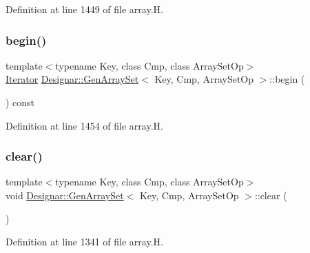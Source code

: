 Definition at line 1449 of file array.\+H.

\mbox{\label{class_designar_1_1_gen_array_set_a9bccd51f6d73a05400361cf5deff8aac}} 
\subsubsection{\texorpdfstring{begin()}{begin()}\hspace{0.1cm}{\footnotesize\ttfamily [2/2]}}
{\footnotesize\ttfamily template$<$typename Key, class Cmp, class Array\+Set\+Op$>$ \\
\hyperlink{class_designar_1_1_gen_array_set_1_1_iterator}{Iterator} \hyperlink{class_designar_1_1_gen_array_set}{Designar\+::\+Gen\+Array\+Set}$<$ Key, Cmp, Array\+Set\+Op $>$\+::begin (\begin{DoxyParamCaption}{ }\end{DoxyParamCaption}) const\hspace{0.3cm}{\ttfamily [inline]}}



Definition at line 1454 of file array.\+H.

\mbox{\label{class_designar_1_1_gen_array_set_aa1b1d249debb38432e56b2e585d822af}} 
\subsubsection{\texorpdfstring{clear()}{clear()}}
{\footnotesize\ttfamily template$<$typename Key, class Cmp, class Array\+Set\+Op$>$ \\
void \hyperlink{class_designar_1_1_gen_array_set}{Designar\+::\+Gen\+Array\+Set}$<$ Key, Cmp, Array\+Set\+Op $>$\+::clear (\begin{DoxyParamCaption}{ }\end{DoxyParamCaption})\hspace{0.3cm}{\ttfamily [inline]}}



Definition at line 1341 of file array.\+H.

\mbox{\label{class_designar_1_1_gen_array_set_a23644b099a1bf858784e474d833245a8}} 
